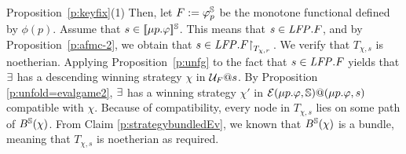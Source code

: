 \begin{proofof}{Proposition~\ref{p:keyfix}(1)}
Then, let $F := \varphi_{p}^{\mathbb{S}}$ be the monotone functional defined by $\phi(p)$.
Assume that $s \in [\![ \mu p.\varphi ]\!]^{\mathbb{S}}$. This means that $s \in \mathit{LFP}. F$, and by Proposition~\ref{p:afmc-2}, we obtain that $s \in \mathit{LFP}. F{\upharpoonright}_{T_{\chi,r}}\,$. We verify that $T_{\chi, s}$ is noetherian.
Applying Proposition~\ref{p:unfg} to the fact that $s \in \mathit{LFP}. F$ yields that $\exists$ has a descending winning strategy $\chi$
in $\mathcal{U}_{F}@s$. 
By Proposition \ref{p:unfold=evalgame2}, $\exists$ has a winning strategy $\chi'$ in $\mathcal{E}(\mu p.\varphi,\mathbb{S})@(\mu p.\varphi,s)$ compatible with $\chi$. Because of compatibility, every node in $T_{\chi, s}$ lies on some path of $B^{\mathbb{S}}(\chi)$. From Claim \ref{p:strategybundledEv}, we known that $B^{\mathbb{S}}(\chi)$ is a bundle, meaning that  $T_{\chi, s}$ is noetherian as required.   
\end{proofof}
